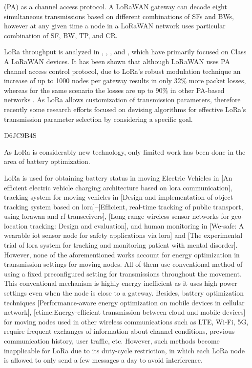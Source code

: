 (PA) as a channel access protocol.
A LoRaWAN gateway can decode eight simultaneous transmissions based on different combinations of SFs and BWs,
	however at any given time a node in a LoRaWAN network uses particular combination of SF,
	BW,
	TP,
	and CR.


LoRa throughput is analyzed in \cite{adelantado_understanding_2017},
	\cite{bor_lora_2016},
	\cite{jetmir_haxhibeqiri_lora_2017},
	and \cite{mikhaylov_analysis_2016},
	which have primarily focused on Class A LoRaWAN devices.
It has been shown that although LoRaWAN uses PA channel access control protocol,
	due to LoRa’s robust modulation technique an increase of up to 1000 nodes per gateway results in only 32\% more packet losses,
whereas for the same scenario the losses are up to 90\% in other PA-based networks \cite{jetmir_haxhibeqiri_lora_2017}.
As LoRa allows customization of transmission parameters,
	therefore recently some research efforts focused on devising algorithms for effective LoRa’s transmission parameter selection by considering a specific goal.



\cite{gupta_battery_2019} D6JC9B4S

As LoRa is considerably new technology,
	only limited work has been done in the area of battery optimization.



LoRa is used for obtaining battery status in moving Electric Vehicles in [An efﬁcient electric vehicle charging architecture based on lora communication],
	tracking system for moving vehicles in [Design and implementation of object tracking system based on lora]–[Efﬁcient,
	real-time tracking of public transport,
	using lorawan and rf transceivers],
	[Long-range wireless sensor networks for geo-location tracking:
	Design and evaluation],
	and human monitoring in [We-safe:
	A wearable iot sensor node for safety applications via lora] and [The experimental trial of lora system for tracking and monitoring patient with mental disorder].
However,
	none of the aforementioned works account for energy optimization in transmission settings for moving nodes.
All of them use conventional method of using a fixed preconfigured setting for transmissions throughout the movement.
This conventional mechanism is highly energy inefficient as it uses high power settings even when the node is close to a gateway.
Besides,
	battery optimization techniques [Performance-aware energy optimization on mobile devices in cellular network],
	[etime:Energy-efﬁcient transmission between cloud and mobile devices] for moving nodes used in other wireless communications such as LTE,
	Wi-Fi, 5G,
	require frequent exchanges of information about channel conditions,
	previous communication history,
	user traffic,
	etc.
However,
	such methods become inapplicable for LoRa due to its duty-cycle restriction,
	in which each LoRa node is allowed to only send a few messages a day to avoid interference.

